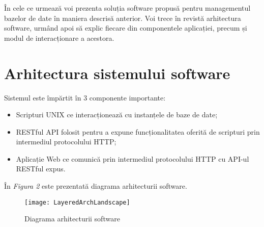 În cele ce urmează voi prezenta soluția software propusă pentru managementul bazelor de date în maniera descrisă anterior. Voi trece în revistă arhitectura software, urmând apoi să explic fiecare din componentele aplicației, precum și modul de interacționare a acestora.
\\

\section{Arhitectura sistemului software}
Sistemul este împărtit în 3 componente importante:
\begin{itemize}
\item Scripturi UNIX ce interacționează cu instanțele de baze de date;
\item RESTful API folosit pentru a expune funcționalitatea oferită de scripturi prin intermediul protocolului HTTP;
\item Aplicație Web ce comunică prin intermediul protocolului HTTP cu API-ul RESTful expus.
\end{itemize}
În \textit{Figura 2} este prezentată diagrama arhitecturii software.
\begin{figure}[h]
	\centering
	\texttt{[image: LayeredArchLandscape]}
    \caption{Diagrama arhitecturii software}
    \label{fig:LayeredArchPortrait}
\end{figure}
\newpage
